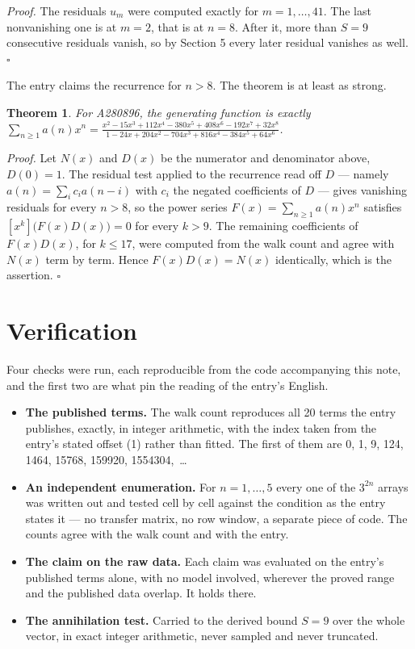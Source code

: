 \documentclass[11pt]{article}
\newtheorem{theorem}{Theorem}
\theoremstyle{definition}
\begin{document}
{\itshape Proof.} The residuals $u_m$ were computed exactly for $m = 1,\dots,41$. The last nonvanishing one is at $m = 2$, that is at $n = 8$. After it, more than $S = 9$ consecutive residuals vanish, so by Section 5 every later residual vanishes as well. $\square$

The entry claims the recurrence for $n > 8$. The theorem is at least as strong.

\begin{theorem} For A280896, the generating function is exactly $\sum_{n\ge 1} a(n)x^n = \frac{x^{2} - 15x^{3} + 112x^{4} - 380x^{5} + 408x^{6} - 192x^{7} + 32x^{8}}{1 - 24x + 204x^{2} - 704x^{3} + 816x^{4} - 384x^{5} + 64x^{6}}$.\end{theorem}

{\itshape Proof.} Let $N(x)$ and $D(x)$ be the numerator and denominator above, $D(0)=1$. The residual test applied to the recurrence read off $D$ --- namely $a(n) = \sum_i c_i a(n-i)$ with $c_i$ the negated coefficients of $D$ --- gives vanishing residuals for every $n > 8$, so the power series $F(x)=\sum_{n\ge 1}a(n)x^n$ satisfies $[x^k]\bigl(F(x)D(x)\bigr) = 0$ for every $k > 9$. The remaining coefficients of $F(x)D(x)$, for $k \le 17$, were computed from the walk count and agree with $N(x)$ term by term. Hence $F(x)D(x) = N(x)$ identically, which is the assertion. $\square$

\section{Verification}

Four checks were run, each reproducible from the code accompanying this note, and the first two are what pin the reading of the entry's English.

\begin{itemize}

\item {\bfseries The published terms.} The walk count reproduces all 20 terms the entry publishes, exactly, in integer arithmetic, with the index taken from the entry's stated offset (1) rather than fitted. The first of them are 0, 1, 9, 124, 1464, 15768, 159920, 1554304,~\dots

\item {\bfseries An independent enumeration.} For $n = 1,\dots,5$ every one of the $3^{2n}$ arrays was written out and tested cell by cell against the condition as the entry states it --- no transfer matrix, no row window, a separate piece of code. The counts agree with the walk count and with the entry.

\item {\bfseries The claim on the raw data.} Each claim was evaluated on the entry's published terms alone, with no model involved, wherever the proved range and the published data overlap. It holds there.

\item {\bfseries The annihilation test.} Carried to the derived bound $S = 9$ over the whole vector, in exact integer arithmetic, never sampled and never truncated.

\end{itemize}
\end{document}
